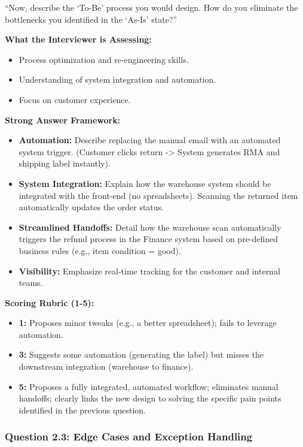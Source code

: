 ``Now, describe the `To-Be' process you would design. How do you
eliminate the bottlenecks you identified in the `As-Is' state?''

\textbf{What the Interviewer is Assessing:}

\begin{itemize}
\tightlist
\item
  Process optimization and re-engineering skills.
\item
  Understanding of system integration and automation.
\item
  Focus on customer experience.
\end{itemize}

\textbf{Strong Answer Framework:}

\begin{itemize}
\tightlist
\item
  \textbf{Automation:} Describe replacing the manual email with an
  automated system trigger. (Customer clicks return -\textgreater{}
  System generates RMA and shipping label instantly).
\item
  \textbf{System Integration:} Explain how the warehouse system should
  be integrated with the front-end (no spreadsheets). Scanning the
  returned item automatically updates the order status.
\item
  \textbf{Streamlined Handoffs:} Detail how the warehouse scan
  automatically triggers the refund process in the Finance system based
  on pre-defined business rules (e.g., item condition = good).
\item
  \textbf{Visibility:} Emphasize real-time tracking for the customer and
  internal teams.
\end{itemize}

\textbf{Scoring Rubric (1-5):}

\begin{itemize}
\tightlist
\item
  \textbf{1:} Proposes minor tweaks (e.g., a better spreadsheet); fails
  to leverage automation.
\item
  \textbf{3:} Suggests some automation (generating the label) but misses
  the downstream integration (warehouse to finance).
\item
  \textbf{5:} Proposes a fully integrated, automated workflow;
  eliminates manual handoffs; clearly links the new design to solving
  the specific pain points identified in the previous question.
\end{itemize}

\subsubsection{Question 2.3: Edge Cases and Exception
Handling}\label{question-2.3-edge-cases-and-exception-handling}

